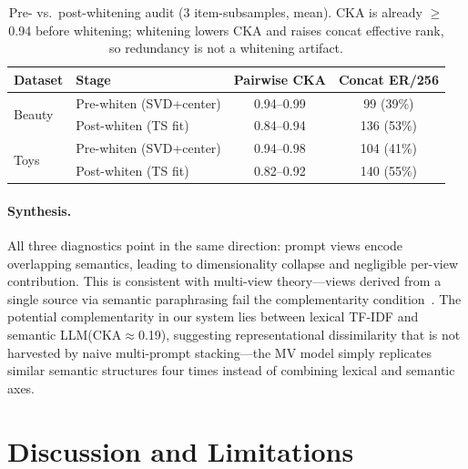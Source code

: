 \documentclass[sigconf,natbib=true,anonymous]{acmart}
\newcommand{\tfidf}{\textsc{TF-IDF}\xspace}
\newcommand{\llm}{\textsc{LLM}\xspace}
\begin{document}
\begin{table}[t]
\centering
\caption{%
Pre- vs.\ post-whitening audit (3 item-subsamples, mean).
CKA is already $\ge$0.94 before whitening; whitening lowers CKA and raises concat effective rank, so redundancy is not a whitening artifact.%
}
\label{tab:cka-prepost}
\small
\begin{tabular}{@{}llcc@{}}
\toprule
Dataset & Stage & Pairwise CKA & Concat ER/256 \\
\midrule
\multirow{2}{*}{Beauty}
 & Pre-whiten (SVD+center)  & 0.94--0.99 & 99 (39\%) \\
 & Post-whiten (TS fit)     & 0.84--0.94 & 136 (53\%) \\
\midrule
\multirow{2}{*}{Toys}
 & Pre-whiten (SVD+center)  & 0.94--0.98 & 104 (41\%) \\
 & Post-whiten (TS fit)     & 0.82--0.92 & 140 (55\%) \\
\bottomrule
\end{tabular}
\end{table}

\paragraph{Synthesis.}
All three diagnostics point in the same direction: prompt views encode overlapping semantics, leading to dimensionality collapse and negligible per-view contribution.
This is consistent with multi-view theory---views derived from a single source via semantic paraphrasing fail the complementarity condition~\cite{xu2013multiview}.
The potential complementarity in our system lies between lexical \tfidf and semantic \llm (CKA$\approx$0.19), suggesting representational dissimilarity that is not harvested by naive multi-prompt stacking---the MV model simply replicates similar semantic structures four times instead of combining lexical and semantic axes.

\section{Discussion and Limitations}
\label{sec:discussion}
\end{document}

